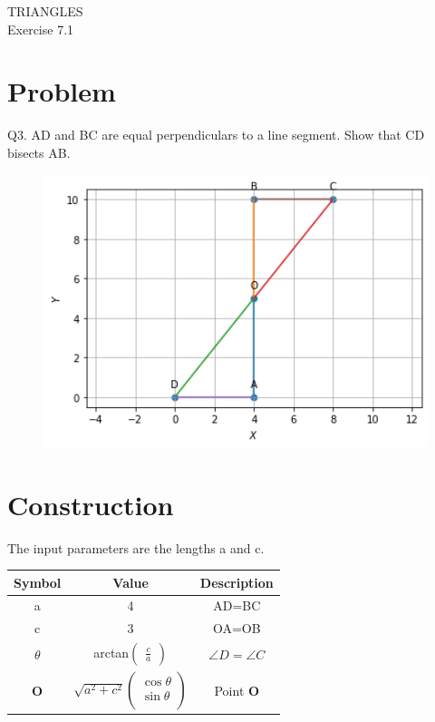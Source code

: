 \documentclass[10pt,a4paper]{article}
\title{\mytitle}
\newcommand{\myvec}[1]{\ensuremath{\begin{pmatrix}#1\end{pmatrix}}}
\let\vec\mathbf
\begin{document}
\begin{center}
\textbf\large{TRIANGLES}\\
\textbf\large{Exercise 7.1}
\end{center}

\tableofcontents
\section{Problem}
Q3. AD and BC are equal perpendiculars to a line segment. Show that CD bisects AB.
\begin{figure}[!h]
	\begin{center}
		\includegraphics[width=5in]{./figs/figure.png}
	\end{center}
\caption{}
\label{figure}
\end{figure}
\pagebreak
\section{Construction}
The input parameters are the lengths a and c.\\
{
\setlength\extrarowheight{2pt}
\begin{tabular}{|c|c|c|}
	\hline
	\textbf{Symbol}&\textbf{Value}&\textbf{Description}\\
	\hline
	a&4&AD=BC\\
	\hline
	c&3&OA=OB\\
	\hline
	$\theta$&arctan$\myvec{\frac{c}{a}}$&$\angle{D}=\angle{C}$\\
	\hline
	$\vec{O}$&$\sqrt{a^2+c^2}%
	\begin{pmatrix}
		\cos\theta\\
		\sin\theta\\
	\end{pmatrix}$%
	&Point $\vec{O}$\\
	\hline
\end{tabular}
}
\end{document}

